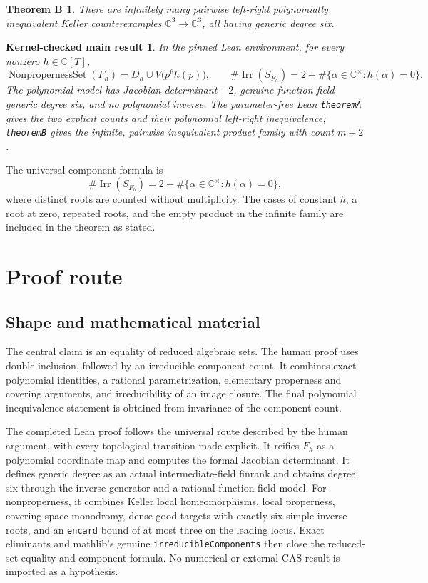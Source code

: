 \documentclass[11pt]{article}
\newtheorem*{theoremB}{Theorem B}
\newtheorem*{formalresult}{Kernel-checked main result}
\newcommand{\C}{\mathbb{C}}
\newcommand{\Irr}{\operatorname{Irr}}
\begin{document}
\begin{theoremB}
There are infinitely many pairwise left-right polynomially inequivalent Keller
counterexamples $\C^3\to\C^3$, all having generic degree six.
\end{theoremB}

\begin{formalresult}
In the pinned Lean environment, for every nonzero $h\in\C[T]$,
\[
 \operatorname{NonpropernessSet}(F_h)
 =D_h\cup V\bigl(p^6h(p)\bigr),
 \qquad
 \#\Irr(S_{F_h})
 =2+\#\{\alpha\in\C^\times:h(\alpha)=0\}.
\]
The polynomial model has Jacobian determinant $-2$, genuine function-field
generic degree six, and no polynomial inverse.  The parameter-free Lean
\texttt{theoremA} gives the two explicit counts and their polynomial
left-right inequivalence; \texttt{theoremB} gives the infinite, pairwise
inequivalent product family with count $m+2$.
\end{formalresult}

The universal component formula is
\[
 \#\Irr(S_{F_h})
 =2+\#\{\alpha\in\C^\times:h(\alpha)=0\},
\]
where distinct roots are counted without multiplicity.  The cases of constant
$h$, a root at zero, repeated roots, and the empty product in the infinite
family are included in the theorem as stated.

\section{Proof route}

\subsection{Shape and mathematical material}

The central claim is an equality of reduced algebraic sets.  The human proof
uses double inclusion, followed by an irreducible-component count.  It combines
exact polynomial identities, a rational parametrization, elementary properness
and covering arguments, and irreducibility of an image closure.  The final
polynomial inequivalence statement is obtained from invariance of the
component count.

The completed Lean proof follows the universal route described by the human
argument, with every topological transition made explicit.  It reifies $F_h$
as a polynomial coordinate map and computes the formal Jacobian determinant.
It defines generic degree as an actual intermediate-field finrank and obtains
degree six through the inverse generator and a rational-function field model.
For nonproperness, it combines Keller local homeomorphisms, local properness,
covering-space monodromy, dense good targets with exactly six simple inverse
roots, and an \texttt{encard} bound of at most three on the leading locus.
Exact eliminants and mathlib's genuine \texttt{irreducibleComponents} then
close the reduced-set equality and component formula.  No numerical or
external CAS result is imported as a hypothesis.
\end{document}
